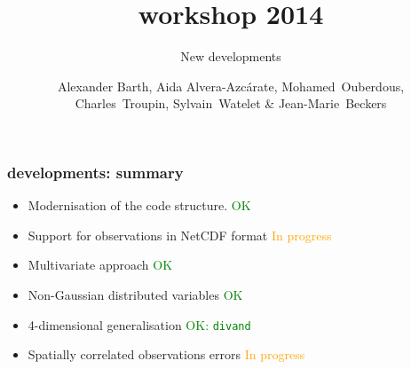 
\parindent 0cm

\author[Alexander Barth, Aida Alvera-Azc\'{a}rate, Mohamed~Ouberdous, Charles~Troupin, Sylvain~Watelet \& Jean-Marie~Beckers]{Alexander Barth, Aida Alvera-Azc\'{a}rate, Mohamed~Ouberdous,\\
 Charles~Troupin, Sylvain~Watelet \& Jean-Marie~Beckers}
  
\title[]{\diva workshop 2014}
\subtitle{New developments}
\date{}


\maketitlepage %


\newcommand{\ignore}[1]{}

\newenvironment{changemargin}[2]{\begin{list}{}{%
\setlength{\topsep}{0pt}%
\setlength{\leftmargin}{0pt}%
\setlength{\rightmargin}{0pt}%
\setlength{\listparindent}{\parindent}%
\setlength{\itemindent}{\parindent}%
\setlength{\parsep}{0pt plus 1pt}%
\addtolength{\leftmargin}{#1}%
\addtolength{\rightmargin}{#2}%
}\item }{\end{list}}


\begin{frame}[c]
\frametitle{\diva developments: summary}

\begin{itemize}

\item<1-> Modernisation of the code structure. \hfill  \textcolor{Green}{OK}
 
\item<2-> Support for observations in NetCDF format \hfill \textcolor{Orange}{In progress}

\item<3-> Multivariate approach   \hfill  \textcolor{Green}{OK}

\item<4-> Non-Gaussian distributed variables \hfill  \textcolor{Green}{OK}

\item<5-> 4-dimensional generalisation \hfill  \textcolor{Green}{OK: \texttt{divand}}

\item<6-> Spatially correlated observations errors \hfill \textcolor{Orange}{In progress}

\end{itemize}

\end{frame}

